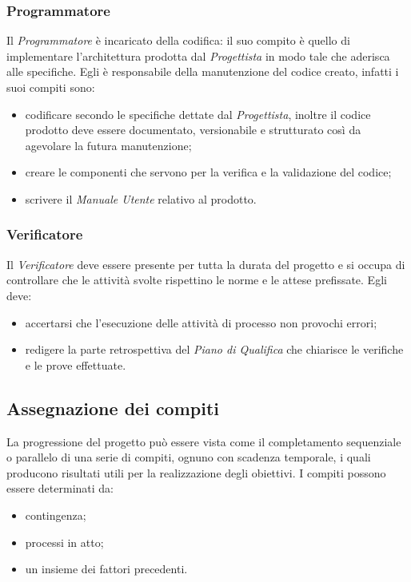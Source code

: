 \subsubsection{Programmatore}\label{4.2.2.5}

Il \textit{Programmatore} è incaricato della codifica: il suo compito è quello di implementare l'architettura prodotta dal \textit{Progettista} in modo tale che aderisca alle specifiche. Egli è responsabile della manutenzione del codice creato, infatti i suoi compiti sono:
\begin{itemize}
	\item codificare secondo le specifiche dettate dal \textit{Progettista}, inoltre il codice prodotto deve essere documentato, versionabile e strutturato così da agevolare la futura manutenzione;
	\item creare le componenti che servono per la verifica e la validazione del codice;
	\item scrivere il \textit{Manuale Utente} relativo al prodotto.
\end{itemize}

\subsubsection{Verificatore}\label{4.2.2.6}

Il \textit{Verificatore} deve essere presente per tutta la durata del progetto e si occupa di controllare che le attività svolte rispettino le norme e le attese prefissate. Egli deve:
\begin{itemize}
	\item accertarsi che l'esecuzione delle attività di processo non provochi errori;
	\item redigere la parte retrospettiva del \textit{Piano di Qualifica} che chiarisce le verifiche e le prove effettuate.
\end{itemize}

\subsection{Assegnazione dei compiti}\label{4.2.3}

La progressione del progetto può essere vista come il completamento sequenziale o parallelo di una serie di compiti, ognuno con scadenza temporale, i quali producono risultati utili per la realizzazione degli obiettivi. I compiti possono essere determinati da:
\begin{itemize}
	\item contingenza;
	\item processi in atto;
	\item un insieme dei fattori precedenti.
\end{itemize}

